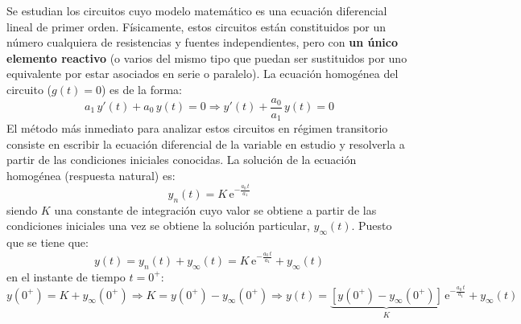 Se estudian los circuitos cuyo modelo matemático es una ecuación
diferencial lineal de primer orden. Físicamente, estos circuitos están
constituidos por un número cualquiera de resistencias y fuentes
independientes, pero con \textbf{un único elemento reactivo} (o varios
del mismo tipo que puedan ser sustituidos por uno equivalente por
estar asociados en serie o paralelo). La ecuación homogénea del
circuito ($g(t)=0$) es de la forma:
\begin{equation*}
  a_1\,y'(t)+a_0\,y(t)=0\Rightarrow y'(t)+\dfrac{a_0}{a_1}\,y(t)=0
\end{equation*}
El método más inmediato para analizar estos circuitos en régimen
transitorio consiste en escribir la ecuación diferencial de la
variable en estudio y resolverla a partir de las condiciones iniciales
conocidas. %
La solución de la ecuación homogénea ({respuesta natural}) es:
\begin{equation}\label{eq:respuesta_natural_1}
  \boxed{y_n(t)=K\,\mathrm{e}^{-\frac{a_0\,t}{a_1}}}
\end{equation}
siendo $K$ una constante de integración cuyo valor se obtiene a partir
de las condiciones iniciales una vez se obtiene la solución
particular, $y_{\infty}(t)$. Puesto que se tiene que:
\begin{equation*}
  y(t)=y_n(t)+y_\infty(t)=K\,\mathrm{e}^{-\frac{a_0\,t}{a_1}}+y_\infty(t)
\end{equation*}
en el instante de tiempo $t=0^+$:
\begin{equation}\label{eq:ecuacion_1orden}
  y(0^+)=K+y_\infty(0^+)\Rightarrow K=y(0^+)-y_\infty(0^+)\Rightarrow \boxed{y(t)=\underbrace{\left[y(0^+)-y_\infty(0^+) \right]}_{K}\,\mathrm{e}^{-\frac{a_0\,t}{a_1}}+y_\infty(t)}
\end{equation}
	
